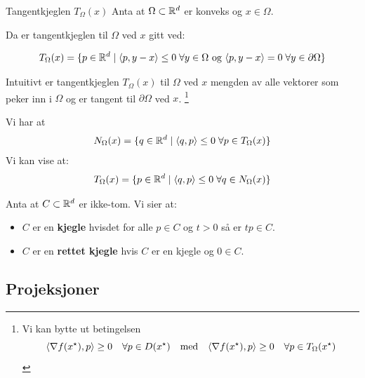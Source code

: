 \begin{definition}{Tangentkjeglen \(T_\Omega(x)\)}{}
  Anta at \(\Omega \subset \mathbb{R}^d\) er konveks og \(x \in \Omega\).

  Da er tangentkjeglen til \(\Omega\) ved \(x\) gitt ved:

  \[
    T_\Omega(x) = \{p \in \mathbb{R}^d \mid \langle p, y - x\rangle \leq 0 \; \forall y \in \Omega \text{ og } \langle p, y - x\rangle = 0 \; \forall y \in \partial \Omega\}
  \]

  Intuitivt er tangentkjeglen \(T_\Omega(x)\) til \(\Omega\) ved \(x\) mengden av alle vektorer som peker inn i \(\Omega\) og er tangent til \(\partial \Omega\) ved \(x\).
  \footnote{
  Vi kan bytte ut betingelsen 
  \[
    \langle\nabla f(x^\star), p\rangle \geq 0 \quad \forall p \in D(x^\star) \quad \text{med} \quad \langle\nabla f(x^\star), p\rangle \geq 0 \quad \forall p \in T_\Omega(x^\star)
  \]
}
\end{definition}

\begin{remark}{}{}
  Vi har at 
  \[
  N_\Omega(x) = \{q \in \mathbb{R}^d \mid \langle q, p\rangle \leq 0 \; \forall p \in T_\Omega(x)\}
  \]
  Vi kan vise at:
  \begin{align*}
    T_\Omega(x) & = \{p \in \mathbb{R}^d \mid \langle q, p\rangle \leq 0 \; \forall q \in N_\Omega(x)\} \\
  \end{align*}
\end{remark}

\begin{remark}{}{}
  Anta at \(C \subset \mathbb{R}^d\) er ikke-tom.
  Vi sier at:
  \begin{itemize}
    \item \(C\) er en \textbf{kjegle} hvisdet for alle \(p \in C\) og \(t > 0\) så er \(t p \in C\).
    \item \(C\) er en \textbf{rettet kjegle} hvis \(C\) er en kjegle og \(0 \in C\).
  \end{itemize}
\end{remark}

\subsection*{Projeksjoner}

